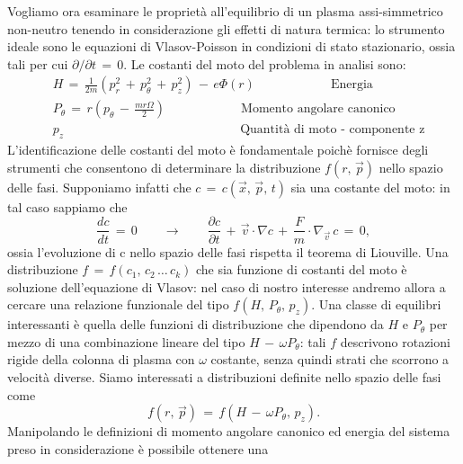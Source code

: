 Vogliamo ora esaminare le proprietà all'equilibrio di un plasma assi-simmetrico non-neutro tenendo in considerazione gli effetti 
di natura termica: lo strumento ideale sono le equazioni di Vlasov-Poisson in condizioni di stato stazionario, ossia tali per cui 
$\partial/\partial t \,=\,0$. Le costanti del moto del problema in analisi sono:
\begin{align}
    & H\,=\,\frac{1}{2m}\left(p_r^2\,+\,p_\theta^2\,+\,p_z^2\right)\,-\,e\Phi\left(r\right) \qquad \qquad \qquad  \text{Energia} \\
    & P_\theta\,=\,r\left(p_\theta\,-\,\frac{mr\Omega}{2}\right)  \qquad \qquad \qquad \text{Momento angolare canonico}  \\
    & p_z \qquad \qquad \qquad \qquad \qquad \qquad \qquad \text{Quantità di moto - componente z}
\end{align}
L'identificazione delle costanti del moto è fondamentale poichè fornisce degli strumenti che consentono di determinare la 
distribuzione $f\left(r,\,\vec{p}\right)$ nello spazio delle fasi. Supponiamo infatti che $c\,=\,c\left(\vec{x},\,\vec{p},\,t\right)$ 
sia una costante del moto: in tal caso sappiamo che 
\begin{equation}
    \frac{dc}{dt}\,=\,0 \qquad \longrightarrow \qquad \frac{\partial c}{\partial t}\,+\,\vec{v} \cdot \nabla c\,+\,\frac{F}{m} \cdot \nabla_{\vec{v}}\,c\,=\,0, 
    \label{equation: const_Vlasov}
\end{equation}
ossia l'evoluzione di c nello spazio delle fasi rispetta il teorema di Liouville. Una distribuzione $f\,=\,f\left(c_1,\,c_2\,\dots\, c_k\right)$ 
che sia funzione di costanti del moto è soluzione dell'equazione di Vlasov: nel caso di nostro interesse andremo allora a 
cercare una relazione funzionale del tipo $f\left(H,\,P_\theta,\,p_z\right)$. Una classe di equilibri interessanti è quella
delle funzioni di distribuzione che dipendono da $H$ e $P_\theta$ per mezzo di una combinazione lineare del tipo $H\,-\,\omega P_\theta$:  
tali $f$ descrivono rotazioni rigide della colonna di plasma con $\omega$ costante, senza quindi strati che 
scorrono a velocità diverse. Siamo interessati a distribuzioni definite nello spazio delle fasi come
\begin{equation}
    f\left(r,\,\vec{p}\right)\,=\,f\left(H\,-\,\omega P_\theta,\,p_z\right).
    \label{equation: interesting_distributions}
\end{equation}
Manipolando le definizioni di momento angolare canonico ed energia del sistema preso in considerazione è possibile ottenere una 
